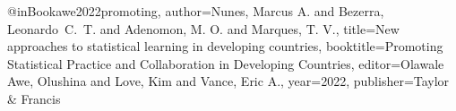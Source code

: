 @inBook{awe2022promoting,
  author={Nunes, Marcus A. and Bezerra, Leonardo~C.~T. and Adenomon, M. O. and Marques, T. V.},
  title={New approaches to statistical learning in developing countries},
  booktitle={Promoting Statistical Practice and Collaboration in Developing Countries},
  editor={{Olawale Awe}, Olushina and Love, Kim and Vance, Eric A.},
  year={2022},
  publisher={Taylor \& Francis}
}